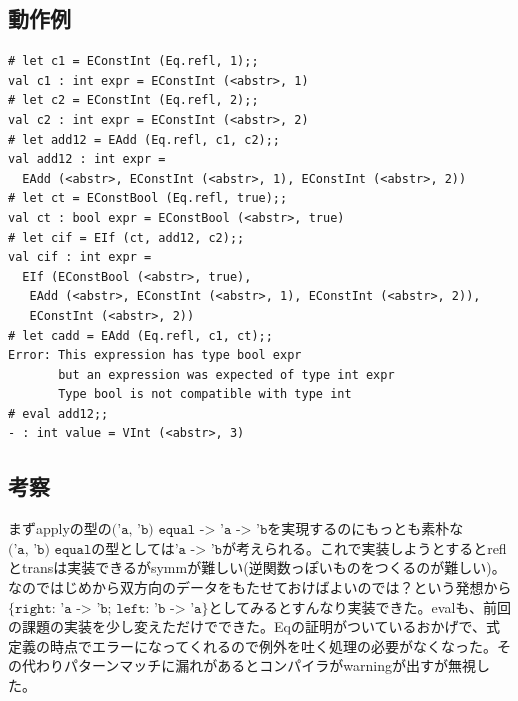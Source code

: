 \documentclass[11pt,a4paper]{jsarticle}
\begin{document}
\subsection*{動作例}
\begin{lstlisting}[basicstyle=\ttfamily\footnotesize, frame=single]
# let c1 = EConstInt (Eq.refl, 1);;
val c1 : int expr = EConstInt (<abstr>, 1)
# let c2 = EConstInt (Eq.refl, 2);;
val c2 : int expr = EConstInt (<abstr>, 2)
# let add12 = EAdd (Eq.refl, c1, c2);;
val add12 : int expr =
  EAdd (<abstr>, EConstInt (<abstr>, 1), EConstInt (<abstr>, 2))
# let ct = EConstBool (Eq.refl, true);;
val ct : bool expr = EConstBool (<abstr>, true)
# let cif = EIf (ct, add12, c2);;
val cif : int expr =
  EIf (EConstBool (<abstr>, true),
   EAdd (<abstr>, EConstInt (<abstr>, 1), EConstInt (<abstr>, 2)),
   EConstInt (<abstr>, 2))
# let cadd = EAdd (Eq.refl, c1, ct);;
Error: This expression has type bool expr
       but an expression was expected of type int expr
       Type bool is not compatible with type int 
# eval add12;;
- : int value = VInt (<abstr>, 3)
\end{lstlisting}
\subsection*{考察}
まずapplyの型の$\texttt{('a, 'b) equal -> 'a -> 'b}$を実現するのにもっとも素朴な$\texttt{('a, 'b) equal}$の型としては$\texttt{'a -> 'b}$が考えられる。これで実装しようとするとreflとtransは実装できるがsymmが難しい(逆関数っぽいものをつくるのが難しい)。なのではじめから双方向のデータをもたせておけばよいのでは？という発想から$\texttt{\{right: 'a -> 'b; left: 'b -> 'a\}}$としてみるとすんなり実装できた。evalも、前回の課題の実装を少し変えただけでできた。Eqの証明がついているおかげで、式定義の時点でエラーになってくれるので例外を吐く処理の必要がなくなった。その代わりパターンマッチに漏れがあるとコンパイラがwarningが出すが無視した。
\end{document}
